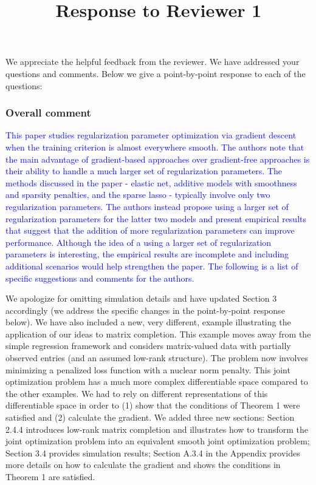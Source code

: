 \documentclass[]{article}
\title{Response to Reviewer 1}
\newcommand{\overall}[1]{\textcolor{blue}{#1}}
\begin{document}
	
	\maketitle
	
	We appreciate the helpful feedback from the reviewer. We have addressed your questions and comments. Below we give a point-by-point response to each of the questions:
	
	\subsubsection*{Overall comment}
	\overall{This paper studies regularization parameter optimization via gradient descent when the training criterion is almost everywhere smooth. The authors note that the main advantage of gradient-based approaches over gradient-free approaches is their ability to handle a much larger set of regularization parameters. The methods discussed in the paper - elastic net, additive models with smoothness and sparsity penalties, and the sparse lasso - typically involve only two regularization parameters. The authors instead propose using a larger set of regularization parameters for the latter two models and present empirical results that suggest that the addition of more regularization parameters can improve performance. Although the idea of a using a larger set of regularization parameters is interesting, the empirical results are incomplete and including additional scenarios would help strengthen the paper. The following is a list of specific suggestions and comments for the authors.}
	
	We apologize for omitting simulation details and have updated Section 3 accordingly (we address the specific changes in the point-by-point response below). We have also included a new, very different, example illustrating the application of our ideas to matrix completion. This example moves away from the simple regression framework and considers matrix-valued data with partially observed entries (and an assumed low-rank structure). The problem now involves minimizing a penalized loss function with a nuclear norm penalty. This joint optimization problem has a much more complex differentiable space compared to the other examples. We had to rely on different representations of this differentiable space in order to (1) show that the conditions of Theorem 1 were satisfied and (2) calculate the gradient. We added three new sections: Section 2.4.4 introduces low-rank matrix completion and illustrates how to transform the joint optimization problem into an equivalent smooth joint optimization problem; Section 3.4 provides simulation results; Section A.3.4 in the Appendix provides more details on how to calculate the gradient and shows the conditions in Theorem 1 are satisfied.
		
\end{document}
